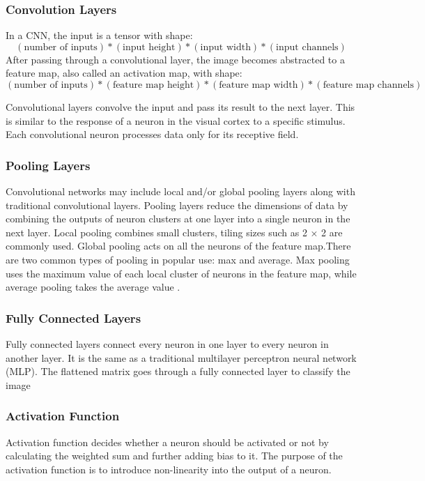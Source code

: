         \subsubsection{Convolution Layers}
        In a CNN, the input is a tensor with shape:        
        \[(\text{number of inputs}) * (\text{input height}) * (\text{input width}) * (\text{input channels})\]
        After passing through a convolutional layer, the image becomes abstracted to a feature map, also called an activation map, with shape:
        \[(\text{number of inputs}) * (\text{feature map height}) * (\text{feature map width}) * (\text{feature map channels})\]
        \par \vspace{1em}
        Convolutional layers convolve the input and pass its result to the next layer. This is similar to the response of a neuron in the visual cortex to a specific stimulus\cite{convnet-2}. Each convolutional neuron processes data only for its receptive field.
        
        \subsubsection{Pooling Layers}
        Convolutional networks may include local and/or global pooling layers along with traditional convolutional layers. Pooling layers reduce the dimensions of data by combining the outputs of neuron clusters at one layer into a single neuron in the next layer. Local pooling combines small clusters, tiling sizes such as 2 × 2 are commonly used. Global pooling acts on all the neurons of the feature map.There are two common types of pooling in popular use: max and average. Max pooling uses the maximum value of each local cluster of neurons in the feature map, while average pooling takes the average value \cite{convnet-3}.
        
        \subsubsection{Fully Connected Layers}
        Fully connected layers connect every neuron in one layer to every neuron in another layer. It is the same as a traditional multilayer perceptron neural network (MLP). The flattened matrix goes through a fully connected layer to classify the image
        
        \subsubsection{Activation Function}
        Activation function decides whether a neuron should be activated or not by calculating the weighted sum and further adding bias to it. The purpose of the activation function is to introduce non-linearity into the output of a neuron. 
        
